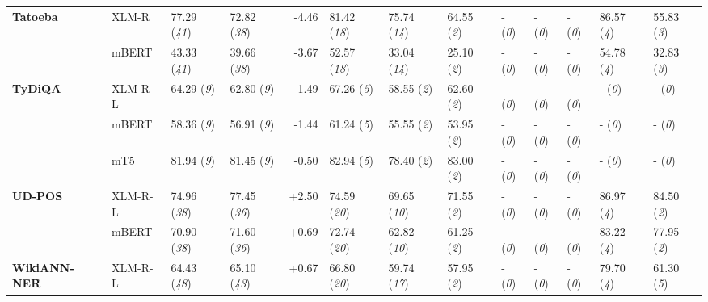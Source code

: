 \begin{tabular}{ll||llr|llllllll}
	\multirow{2}{*}{\textbf{Tatoeba}\acc} & XLM-R & 77.29 (\textit{41}) & 72.82 (\textit{38}) & -4.46 & \cellcolor{high-color!40}  81.42 (\textit{18}) &  75.74 (\textit{14}) & \cellcolor{low-color!40}  64.55 (\textit{2}) & - (\textit{0}) & - (\textit{0}) & - (\textit{0}) &  86.57 (\textit{4}) &  55.83 (\textit{3}) \\
	 & mBERT & 43.33 (\textit{41}) & 39.66 (\textit{38}) & -3.67 & \cellcolor{high-color!40}  52.57 (\textit{18}) &  33.04 (\textit{14}) & \cellcolor{low-color!40}  25.10 (\textit{2}) & - (\textit{0}) & - (\textit{0}) & - (\textit{0}) &  54.78 (\textit{4}) &  32.83 (\textit{3}) \\\midrule
	\multirow{3}{*}{\textbf{TyDiQA}\f} & XLM-R-L & 64.29 (\textit{9}) & 62.80 (\textit{9}) & -1.49 & \cellcolor{high-color!40}  67.26 (\textit{5}) & \cellcolor{low-color!40}  58.55 (\textit{2}) & \cellcolor{low-color!40}  62.60 (\textit{2}) & - (\textit{0}) & - (\textit{0}) & - (\textit{0}) & - (\textit{0}) & - (\textit{0}) \\
	 & mBERT & 58.36 (\textit{9}) & 56.91 (\textit{9}) & -1.44 & \cellcolor{high-color!40}  61.24 (\textit{5}) & \cellcolor{low-color!40}  55.55 (\textit{2}) & \cellcolor{low-color!40}  53.95 (\textit{2}) & - (\textit{0}) & - (\textit{0}) & - (\textit{0}) & - (\textit{0}) & - (\textit{0}) \\
	 & mT5 & 81.94 (\textit{9}) & 81.45 (\textit{9}) & -0.50 & \cellcolor{high-color!40}  82.94 (\textit{5}) & \cellcolor{low-color!40}  78.40 (\textit{2}) & \cellcolor{low-color!40}  83.00 (\textit{2}) & - (\textit{0}) & - (\textit{0}) & - (\textit{0}) & - (\textit{0}) & - (\textit{0}) \\\midrule
	\multirow{2}{*}{\textbf{UD-POS}\f} & XLM-R-L & 74.96 (\textit{38}) & 77.45 (\textit{36}) & +2.50 & \cellcolor{high-color!40}  74.59 (\textit{20}) &  69.65 (\textit{10}) & \cellcolor{low-color!40}  71.55 (\textit{2}) & - (\textit{0}) & - (\textit{0}) & - (\textit{0}) &  86.97 (\textit{4}) & \cellcolor{low-color!40}  84.50 (\textit{2}) \\
	 & mBERT & 70.90 (\textit{38}) & 71.60 (\textit{36}) & +0.69 & \cellcolor{high-color!40}  72.74 (\textit{20}) &  62.82 (\textit{10}) & \cellcolor{low-color!40}  61.25 (\textit{2}) & - (\textit{0}) & - (\textit{0}) & - (\textit{0}) &  83.22 (\textit{4}) & \cellcolor{low-color!40}  77.95 (\textit{2}) \\\midrule
	\multirow{2}{*}{\textbf{WikiANN-NER}\f} & XLM-R-L & 64.43 (\textit{48}) & 65.10 (\textit{43}) & +0.67 & \cellcolor{high-color!40}  66.80 (\textit{20}) &  59.74 (\textit{17}) & \cellcolor{low-color!40}  57.95 (\textit{2}) & - (\textit{0}) & - (\textit{0}) & - (\textit{0}) &  79.70 (\textit{4}) &  61.30 (\textit{5}) \\

\end{tabular}

